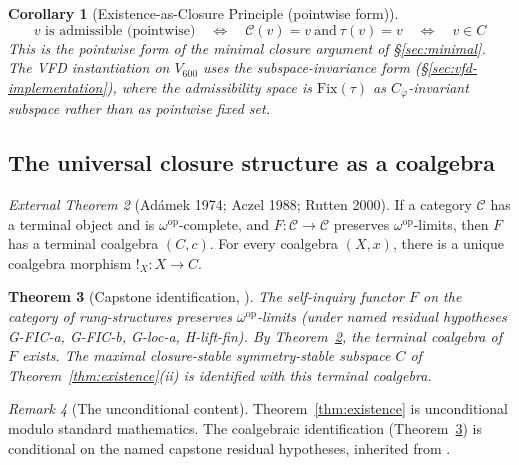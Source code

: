 \documentclass[11pt]{article}
\theoremstyle{plain}
\newtheorem{theorem}{Theorem}[section]
\newtheorem{corollary}[theorem]{Corollary}
\theoremstyle{definition}
\theoremstyle{remark}
\newtheorem{remark}[theorem]{Remark}
\newtheorem{externalthm}[theorem]{External Theorem}
\newcommand{\Ccal}{\mathcal{C}}
\newcommand{\Fix}{\mathrm{Fix}}
\newcommand{\Cph}{C_\varphi}
\newcommand{\catC}{\mathcal{C}}
\begin{document}
\begin{corollary}[Existence-as-Closure Principle (pointwise form)]\label{cor:existence-as-closure}
\begin{equation}\label{eq:existence-as-closure}
  \boxed{\;v \text{ is admissible (pointwise)}\quad\Longleftrightarrow\quad \Ccal(v) = v\ \text{and}\ \tau(v) = v\quad\Longleftrightarrow\quad v \in C\;}
\end{equation}
This is the pointwise form of the minimal closure argument of \S\ref{sec:minimal}. The VFD instantiation on $V_{600}$ uses the subspace-invariance form (\S\ref{sec:vfd-implementation}), where the admissibility space is $\Fix(\tau)$ as $\Cph$-invariant subspace rather than as pointwise fixed set.
\end{corollary}

\subsection{The universal closure structure as a coalgebra}

\begin{externalthm}[Adámek 1974; Aczel 1988; Rutten 2000]\label{thm:adamek}
If a category $\catC$ has a terminal object and is $\omega^{\mathrm{op}}$-complete, and $F: \catC \to \catC$ preserves $\omega^{\mathrm{op}}$-limits, then $F$ has a terminal coalgebra $(C, c)$. For every coalgebra $(X, x)$, there is a unique coalgebra morphism $!_X: X \to C$.
\end{externalthm}

\begin{theorem}[Capstone identification, \citet{SmartCapstone}]\label{thm:capstone}
The self-inquiry functor $F$ on the category of rung-structures preserves $\omega^{\mathrm{op}}$-limits (under named residual hypotheses G-FIC-a, G-FIC-b, G-loc-a, H-lift-fin). By Theorem~\ref{thm:adamek}, the terminal coalgebra of $F$ exists. The maximal closure-stable symmetry-stable subspace $C$ of Theorem~\ref{thm:existence}(ii) is identified with this terminal coalgebra.
\end{theorem}

\begin{remark}[The unconditional content]\label{rem:unconditional}
Theorem~\ref{thm:existence} is unconditional modulo standard mathematics. The coalgebraic identification (Theorem~\ref{thm:capstone}) is conditional on the named capstone residual hypotheses, inherited from \citet{SmartCapstone}.
\end{remark}
\end{document}
